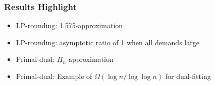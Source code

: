 \documentclass[hyperref,dvipsnames,svgnames,compress]{beamer}
\begin{document}
\begin{frame}
  \frametitle{Results Highlight}
  \large{
  \begin{itemize}
    \addtolength{\itemsep}{1\baselineskip}
  \item \color{blue}LP-rounding: 1.575-approximation
  \item \color{blue}LP-rounding: asymptotic ratio of 1 when all demands large
  \item \color{blue}Primal-dual: $H_n$-approximation
  \item \color{blue}Primal-dual: Example of $\Omega(\log n / \log\log n)$ for dual-fitting
  \end{itemize}}
\end{frame}
\end{document}
